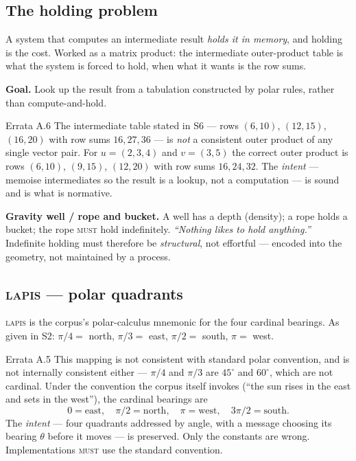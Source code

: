 \documentclass[11pt,a4paper]{article}
\newcommand{\MUST}{\textsc{must}}
\newcommand{\LAPIS}{\textsc{lapis}}
\begin{document}
\subsection{The holding problem}
\label{sec:holding}

A system that computes an intermediate result \emph{holds it in memory}, and
holding is the cost. Worked as a matrix product: the intermediate outer-product
table is what the system is forced to hold, when what it wants is the row sums.

\begin{ruleblock}
\textbf{Goal.} Look up the result from a tabulation constructed by polar rules,
rather than compute-and-hold.
\end{ruleblock}

\begin{errata}{Errata A.6}
The intermediate table stated in S6 --- rows $(6,10)$, $(12,15)$, $(16,20)$
with row sums $16, 27, 36$ --- is \emph{not} a consistent outer product of any
single vector pair. For $u = (2,3,4)$ and $v = (3,5)$ the correct outer product
is rows $(6,10)$, $(9,15)$, $(12,20)$ with row sums $16, 24, 32$. The
\emph{intent} --- memoise intermediates so the result is a lookup, not a
computation --- is sound and is what is normative.
\end{errata}

\textbf{Gravity well / rope and bucket.} A well has a depth (density); a rope
holds a bucket; the rope \MUST{} hold indefinitely. \emph{``Nothing likes to
hold anything.''} Indefinite holding must therefore be \emph{structural}, not
effortful --- encoded into the geometry, not maintained by a process.

\subsection{\LAPIS{} --- polar quadrants}
\label{sec:lapis}

\LAPIS{} is the corpus's polar-calculus mnemonic for the four cardinal bearings.
As given in S2: $\pi/4 = $ north, $\pi/3 = $ east, $\pi/2 = $ south, $\pi = $
west.

\begin{errata}{Errata A.5}
This mapping is not consistent with standard polar convention, and is not
internally consistent either --- $\pi/4$ and $\pi/3$ are $45^\circ$ and
$60^\circ$, which are not cardinal. Under the convention the corpus itself
invokes (``the sun rises in the east and sets in the west''), the cardinal
bearings are
\[
0 = \text{east}, \quad \pi/2 = \text{north}, \quad
\pi = \text{west}, \quad 3\pi/2 = \text{south}.
\]
The \emph{intent} --- four quadrants addressed by angle, with a message choosing
its bearing $\theta$ before it moves --- is preserved. Only the constants are
wrong. Implementations \MUST{} use the standard convention.
\end{errata}
\end{document}
